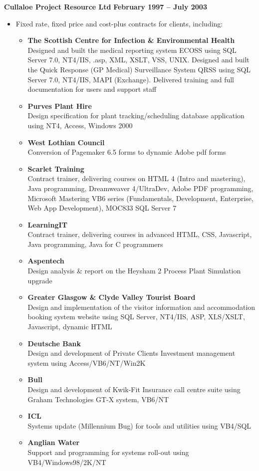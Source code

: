 \documentclass[10pt]{article}
\newenvironment{outerlist}[1][\enskip\textbullet]%
        {\begin{itemize}[#1]}{\end{itemize}%
         \vspace{-.6\baselineskip}}
\newcommand{\blankline}{\quad\pagebreak[2]}
\begin{document}
\blankline

\textbf{Cullaloe Project Resource Ltd}        \hfill \textbf{February 1997 -- July 2003}

\begin{outerlist}
\item[] Fixed rate, fixed price and cost-plus contracts for clients, including:

\begin{outerlist}

\item \textbf{The Scottish Centre for Infection \& Environmental Health} \\ %
		Designed and built the medical reporting system ECOSS using SQL Server 7.0, NT4/IIS, .asp, XML, XSLT, VSS, UNIX. Designed and built the Quick Response (GP Medical) Surveillance System QRSS using SQL Server 7.0, NT4/IIS, MAPI (Exchange). Delivered training and full documentation for users and support staff
\item \textbf{Purves Plant Hire} \\ %
	Design specification for plant tracking/scheduling database application using NT4, Access, Windows 2000
\item \textbf{West Lothian Council}\\ %
	Conversion of Pagemaker 6.5 forms to dynamic Adobe pdf forms 
\item \textbf{Scarlet Training} \\%
	Contract trainer, delivering courses on HTML 4 (Intro and mastering), Java programming, Dreamweaver 4/UltraDev, Adobe PDF programming, Microsoft Mastering VB6 series (Fundamentals, Development, Enterprise, Web App Development), MOC833 SQL Server 7
\item \textbf{LearningIT} \\ %
	Contract trainer, delivering courses in advanced HTML, CSS, Javascript, Java programming, Java for C programmers
\item \textbf{Aspentech} \\ %
	Design analysis \& report on the Heysham 2 Process Plant Simulation upgrade
\item \textbf{Greater Glasgow \& Clyde Valley Tourist Board} \\ %
	Design and implementation of the visitor information and accommodation booking system website using SQL Server, NT4/IIS, ASP, XLS/XSLT, Javascript, dynamic HTML
\item \textbf{Deutsche Bank} \\ %
	Design and development of Private Clients Investment management system using Access/VB6/NT/Win2K
\item \textbf{Bull} \\ %
	Design and development of Kwik-Fit Insurance call centre suite using Graham Technologies GT-X system, VB6/NT
\item \textbf{ICL} \\ %
	Systems update (Millennium Bug) for tools and utilities using VB4/SQL
\item \textbf{Anglian Water} \\ %
	Support and programming for systems roll-out using VB4/Windows98/2K/NT


\end{outerlist}
\end{outerlist}
\end{document}
